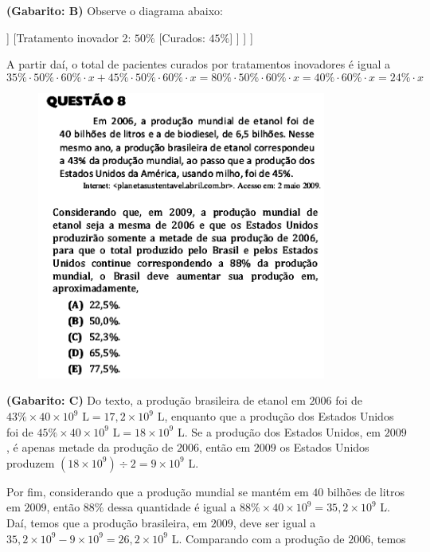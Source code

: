 \documentclass[a4paper]{article}
\begin{document}
\par\textbf{(Gabarito: B)} Observe o diagrama abaixo:
\begin{center}
	\begin{forest}
	[$x$ [Curados: $40\%$ ][Não curados: $60\%$ [Tratamento inovador 1: $50\%$ [Curados: $35\%$] ] [Tratamento inovador 2: $50\%$ [Curados: $45\%$]  ] ] ]
	\end{forest}
\end{center}
\par\vspace{0.3cm} A partir daí, o total de pacientes curados por tratamentos inovadores é igual a
\begin{equation*}
35\%\cdot 50\%\cdot 60\%\cdot x + 45\%\cdot 50\%\cdot 60\%\cdot x = 80\%\cdot 50\%\cdot 60\% \cdot x = 40\%\cdot 60\%\cdot x = 24\%\cdot x
\end{equation*}
\begin{figure}[H]
	\begin{center}
		\includegraphics[width=9.5cm]{L3Q8.png}
	\end{center}
\end{figure}
\par\textbf{(Gabarito: C)} Do texto, a produção brasileira de etanol em $2006$ foi de $43\%\times 40\times 10^9\text{ L} = 17,2\times 10^9$ L, enquanto que a produção dos Estados Unidos foi de $45\%\times 40\times 10^9\text{ L} = 18\times 10^9$ L. Se a produção dos Estados Unidos, em $2009$, é apenas metade da produção de $2006$, então em $2009$ os Estados Unidos produzem $(18\times 10^9)\div2 = 9\times 10^9$ L.
\par\vspace{0.3cm} Por fim, considerando que a produção mundial se mantém em $40$ bilhões de litros em $2009$, então $88\%$ dessa quantidade é igual a $88\%\times 40\times 10^9 = 35,2\times 10^9$ L. Daí, temos que a produção brasileira, em $2009$, deve ser igual a $35,2\times 10^9 - 9\times 10^9 = 26,2\times 10^9$ L. Comparando com a produção de $2006$, temos
\end{document}
